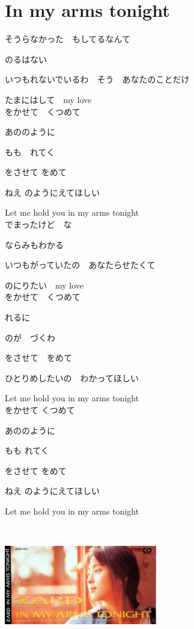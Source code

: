 \section{ In my arms tonight}
\large{

そうらなかった　もしてるなんて

のるはない

いつもれないでいるわ　そう　あなたのことだけ

たまにはして　my love
\\

をかせて　くつめて

あののように

もも　れてく

をさせて をめて

ねえ のようにえてほしい

Let me hold you in my arms tonight
\\

でまったけど　な

ならみもわかる

いつもがっていたの　あなたらせたくて

のにりたい　my love
\\

をかせて　くつめて

れるに

のが　づくわ

をさせて　をめて

ひとりめしたいの　わかってほしい

Let me hold you in my arms tonight
\\

をかせて くつめて

あののように

もも れてく

をさせて をめて

ねえ のようにえてほしい

Let me hold you in my arms tonight

}
{ \ }

\includegraphics[width=0.5\textwidth]{S5.jpg}